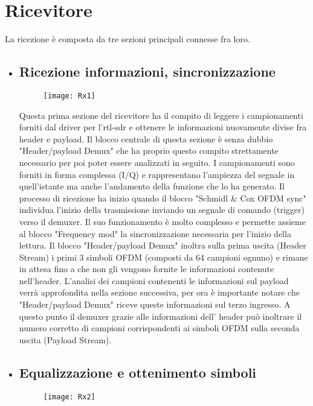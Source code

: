  \section{Ricevitore}
 La ricezione è composta da tre sezioni principali connesse fra loro.
 \begin{itemize}
 	\item \subsection{Ricezione informazioni, sincronizzazione}
 	\begin{figure}[h]
 		\centering
 		\texttt{[image: Rx1]}
 		\caption{}
 	\end{figure}
 Questa prima sezione del ricevitore ha il compito di leggere i campionamenti forniti dal driver per l'rtl-sdr e ottenere le informazioni nuovamente divise fra header e payload. Il blocco centrale di questa sezione è senza dubbio "Header/payload Demux" che ha proprio questo compito strettamente necessario per poi poter essere analizzati in seguito. I campionamenti sono forniti in forma complessa (I/Q) e rappresentano l'ampiezza del segnale in quell'istante ma anche l'andamento della funzione che lo ha generato. Il processo di ricezione ha inizio quando il blocco "Schmidl \& Cox OFDM sync" individua l'inizio della trasmissione inviando un segnale di comando (trigger) verso il demuxer. Il suo funzionamento è molto complesso e permette assieme al blocco "Frequency mod" la sincronizzazione necessaria per l'inizio della lettura. Il blocco "Header/payload Demux" inoltra sulla prima uscita (Header Stream) i primi 3 simboli OFDM (composti da 64 campioni ognuno) e rimane in attesa fino a che non gli vengono fornite le informazioni contenute nell'header. L'analisi dei campioni contenenti le informazioni sul payload verrà approfondita nella sezione successiva, per ora è importante notare che "Header/payload Demux" riceve queste informazioni sul terzo ingresso. A questo punto il demuxer grazie alle informazioni dell' header può inoltrare il numero corretto di campioni corrispondenti ai simboli OFDM sulla seconda uscita (Payload Stream).
 	\item \subsection{Equalizzazione e ottenimento simboli}
 	\begin{figure}[h]
 		\raggedleft
 		\texttt{[image: Rx2]}
 		\caption{}
 	\end{figure}

\end{itemize}

